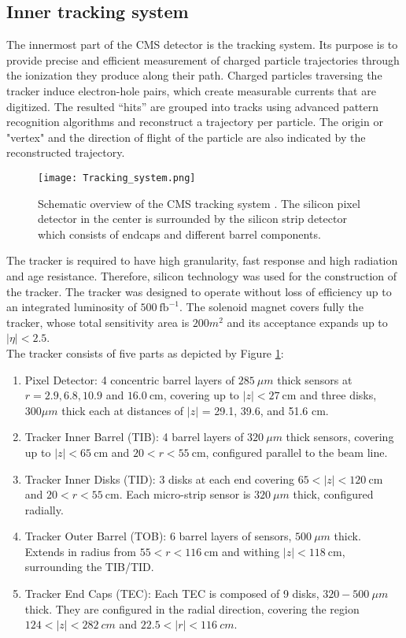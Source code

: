 \subsection{\label{sec:exp_CMS_1}Inner tracking system}
\noindent The innermost part of the CMS detector is the tracking system. Its purpose is to provide precise and efficient measurement of charged particle trajectories through the ionization they produce along their path. Charged particles traversing the tracker induce electron-hole pairs, which create measurable currents that are digitized. The resulted “hits” are grouped into tracks using advanced pattern recognition algorithms and reconstruct a trajectory per particle. The origin or "vertex" and the direction of flight of the particle are also indicated by the reconstructed trajectory.
\begin{figure}[H]
    \centering
    \texttt{[image: Tracking\_system.png]}
    \caption{Schematic overview of the CMS tracking system \cite{CMS:2008xjf}. The silicon pixel detector in the center is surrounded by the silicon strip detector which consists of endcaps and different barrel components.}
    \label{fig:Tracking_system}
\end{figure}
\indent The tracker is required to have high granularity, fast response and high radiation and age resistance. Therefore, silicon technology was used for the construction of the tracker. The tracker was designed to operate without loss of efficiency up to an integrated luminosity of $500 \: \text{fb}^{-1}$. The solenoid magnet covers fully the tracker, whose total sensitivity area is $200 m^2$ and its acceptance expands up to $|\eta| < 2.5$. \\
\indent The tracker consists of five parts as depicted by Figure \ref{fig:Tracking_system}:
\begin{enumerate}
    \item Pixel Detector: 4 concentric barrel layers of $285 \: \mu m$ thick sensors at $r = 2.9, 6.8, 10.9$ and $16.0\: \text{cm}$, covering up to $|z| < 27 \: \text{cm}$  and three disks, $300 \mu m$ thick each at distances of $|z|$ = 29.1, 39.6, and 51.6 cm.
    \item Tracker Inner Barrel (TIB): 4 barrel layers of $320\: \mu m$ thick sensors, covering up to $|z| < 65 \: \text{cm}$ and $20 < r < 55\: \text{cm}$, configured parallel to the beam line.
    \item Tracker Inner Disks (TID): 3 disks at each end covering $65< |z| < 120\: \text{cm}$ and $20 < r < 55\: \text{cm}$. Each micro-strip sensor is $320 \: \mu m$ thick, configured radially.
    \item Tracker Outer Barrel (TOB): 6 barrel layers of sensors, $500 \: \mu m$ thick. Extends in radius from $55 < r < 116\: \text{cm}$ and withing $|z|<118 \:\text{cm}$, surrounding the TIB/TID.
    \item Tracker End Caps (TEC): Each TEC is composed of 9 disks, $320-500 \:\mu m$ thick. They are configured in the radial direction, covering the region $124< |z| <282\: cm$ and $22.5<|r|< 116 \:cm$. 
\end{enumerate}
